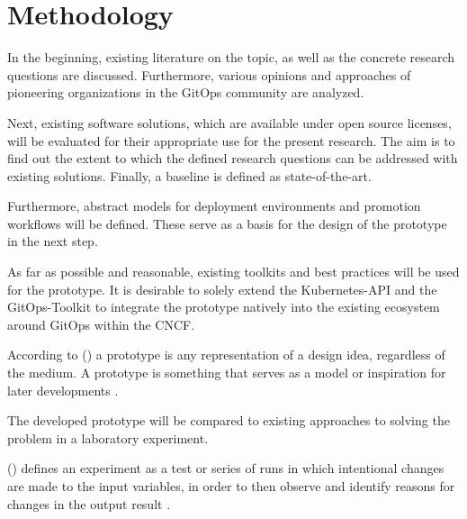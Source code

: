 \chapter{Methodology}

In the beginning, existing literature on the topic, 
as well as the concrete research questions
are discussed.
Furthermore, various
opinions and approaches of pioneering organizations in the GitOps community are analyzed.
\bigskip

\noindent
Next, existing software solutions,
which are available under open source licenses,
will be evaluated for their appropriate use for the present research.
The aim is to find out the extent to which the defined research questions
can be addressed with existing solutions.
Finally, a baseline is defined as state-of-the-art.
\bigskip

\noindent
Furthermore, abstract models for deployment environments
and promotion workflows will be defined.
These serve as a basis for the design of the prototype in the next step.
\bigskip

\noindent
As far as possible and reasonable, existing toolkits and best practices will be used for the prototype.
It is desirable to solely extend
the Kubernetes-API
and the
GitOps-Toolkit
to integrate the prototype natively into the existing ecosystem around GitOps within the CNCF.
\bigskip

\noindent
According to 
\citeauthor{HOUDE1997367} (\citeyear{HOUDE1997367})
a prototype is any representation of a design idea, regardless of the medium.
A prototype is something that serves as a model or inspiration for later developments
\autocite{HOUDE1997367}.
\bigskip

\noindent
The developed prototype will be compared to existing approaches to solving the problem in a laboratory experiment.
\bigskip

\noindent
\citeauthor{montgomery2017design} (\citeyear{montgomery2017design})
defines an experiment as a test 
or series of runs in which intentional changes are made to the input variables, 
in order to then observe and identify reasons for changes in the output result
\autocite{montgomery2017design}.






